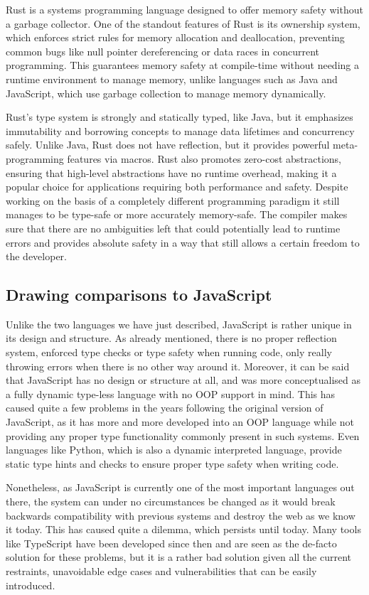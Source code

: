 Rust is a systems programming language designed to offer memory safety without a garbage collector. One of the standout features of Rust is its ownership system, which enforces strict rules for memory allocation and deallocation, preventing common bugs like null pointer dereferencing or data races in concurrent programming. This guarantees memory safety at compile-time without needing a runtime environment to manage memory, unlike languages such as Java and JavaScript, which use garbage collection to manage memory dynamically.

Rust's type system is strongly and statically typed, like Java, but it emphasizes immutability and borrowing concepts to manage data lifetimes and concurrency safely. Unlike Java, Rust does not have reflection, but it provides powerful meta-programming features via macros. Rust also promotes zero-cost abstractions, ensuring that high-level abstractions have no runtime overhead, making it a popular choice for applications requiring both performance and safety. Despite working on the basis of a completely different programming paradigm it still manages to be type-safe or more accurately memory-safe. The compiler makes sure that there are no ambiguities left that could potentially lead to runtime errors and provides absolute safety in a way that still allows a certain freedom to the developer.

\subsection{Drawing comparisons to JavaScript}

Unlike the two languages we have just described, JavaScript is rather unique in its design and structure. As already mentioned, there is no proper reflection system, enforced type checks or type safety when running code, only really throwing errors when there is no other way around it. Moreover, it can be said that JavaScript has no design or structure at all, and was more conceptualised as a fully dynamic type-less language with no OOP support in mind. This has caused quite a few problems in the years following the original version of JavaScript, as it has more and more developed into an OOP language while not providing any proper type functionality commonly present in such systems. Even languages like Python, which is also a dynamic interpreted language, provide static type hints and checks to ensure proper type safety when writing code.

Nonetheless, as JavaScript is currently one of the most important languages out there, the system can under no circumstances be changed as it would break backwards compatibility with previous systems and destroy the web as we know it today. This has caused quite a dilemma, which persists until today. Many tools like TypeScript have been developed since then and are seen as the de-facto solution for these problems, but it is a rather bad solution given all the current restraints, unavoidable edge cases and vulnerabilities that can be easily introduced.

